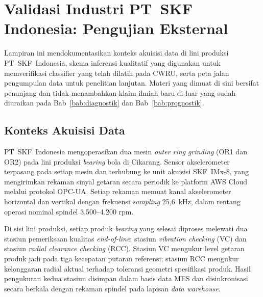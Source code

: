 ﻿%

\chapter{Validasi Industri PT~SKF Indonesia: Pengujian Eksternal}
\label{lamp:klasifikasi_industri}

Lampiran ini mendokumentasikan konteks akuisisi data di lini produksi
PT~SKF~Indonesia, skema inferensi kualitatif yang digunakan untuk
memverifikasi classifier yang telah dilatih pada CWRU, serta peta jalan
pengumpulan data untuk penelitian lanjutan. Materi yang dimuat di sini
bersifat penunjang dan tidak menambahkan klaim ilmiah baru di luar
yang sudah diuraikan pada Bab~\ref{bab:diagnostik}
dan Bab~\ref{bab:prognostik}.

\section{Konteks Akuisisi Data}
\label{lamp:skf_konteks}

PT~SKF~Indonesia mengoperasikan dua mesin \emph{outer ring grinding}
(OR1 dan OR2) pada lini produksi \emph{bearing} bola di Cikarang. Sensor
akselerometer terpasang pada setiap mesin dan terhubung ke unit
akuisisi SKF~IMx-8, yang mengirimkan rekaman sinyal getaran secara
periodik ke platform AWS Cloud melalui protokol OPC-UA. Setiap rekaman
memuat kanal akselerometer horizontal dan vertikal dengan frekuensi
\emph{sampling} 25,6~kHz, dalam rentang operasi nominal spindel
3.500--4.200 rpm.

Di sisi lini produksi, setiap produk \emph{bearing} yang selesai diproses
melewati dua stasiun pemeriksaan kualitas \emph{end-of-line}: stasiun
\emph{vibration checking} (VC) dan stasiun \emph{radial clearance
checking} (RCC). Stasiun VC mengukur level getaran produk jadi pada
tiga kecepatan putaran referensi; stasiun RCC mengukur kelonggaran
radial aktual terhadap toleransi geometri spesifikasi produk. Hasil
pengukuran kedua stasiun disimpan dalam basis data MES dan
disinkronisasi secara berkala dengan rekaman spindel pada lapisan
\emph{data warehouse}.

